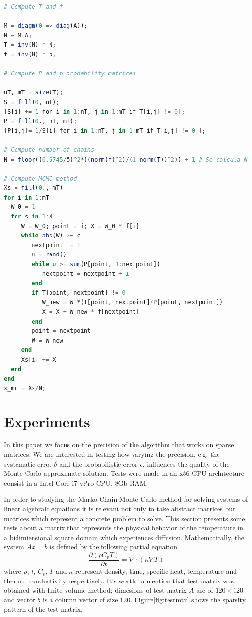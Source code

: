 \documentclass{juliacon}
\begin{document}
\begin{lstlisting}[language = Julia]
# Compute T and f

M = diagm(0 => diag(A));
N = M-A;
T = inv(M) * N;
f = inv(M) * b;
    
# Compute P and p probability matrices

nT, mT = size(T);
S = fill(0, nT);
[S[i] += 1 for i in 1:nT, j in 1:mT if T[i,j] != 0];
P = fill(0., nT, mT); 
[P[i,j]= 1/S[i] for i in 1:nT, j in 1:mT if T[i,j] != 0 ];

# Compute number of chains
N = floor((0.6745/δ)^2*((norm(f)^2)/(1-norm(T))^2)) + 1 # Se calcula N

# Compute MCMC method
Xs = fill(0., mT)
for i in 1:mT
  W_0 = 1
  for s in 1:N
     W = W_0; point = i; X = W_0 * f[i]
     while abs(W) >= ϵ
        nextpoint  = 1
        u = rand()
        while u >= sum(P[point, 1:nextpoint])
           nextpoint = nextpoint + 1
        end
        if T[point, nextpoint] != 0 
           W_new = W *(T[point, nextpoint]/P[point, nextpoint])
           X = X + W_new * f[nextpoint]
        end
        point = nextpoint
        W = W_new
     end
     Xs[i] += X
  end
end
x_mc = Xs/N;

\end{lstlisting}


\section{Experiments}
\label{section_experiments}

In this paper we focus on the precision of the algorithm that works on sparse matrices.  We are interested in testing how varying the precision, e.g. the systematic error $\delta$ and the probabilistic error $\epsilon$,  influences the quality of the Monte Carlo approximate solution. Tests were made in an x86 CPU architecture consist in a Intel Core i7 vPro CPU, 8Gb RAM.

In order to studying the Marko Chain-Monte Carlo method for solving systems of linear algebraic equations it is relevant not only to take abstract matrices but matrices which represent a concrete problem to solve. This section presents some tests about a matrix that represents the physical behavior of the temperature in a bidimiensional square domain which experiences diffusion. Mathematically, the system $Ax=b$ is defined by the following partial equation $$\frac{\partial(\rho C_vT) }{\partial t} = \nabla \cdot (\kappa \nabla T)$$ where $\rho$, $t$, $C_v$, $T$ and $\kappa$ represent density, time, specific heat, temperature and thermal conductivity respectively. It's worth to mention that test matrix was obtained with finite volume method; dimesions of test matrix $A$ are of $120 \times 120$ and vector $b$ is a column vector of size $120$. Figure\ref{fig:testmtx} shows the sparsity pattern of the test matrix.
\end{document}
